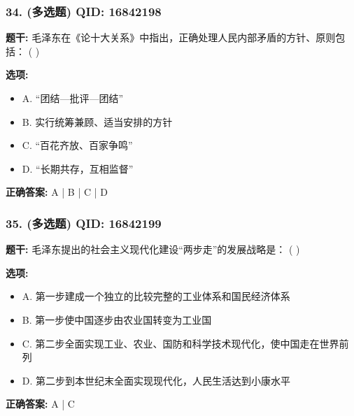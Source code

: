 \documentclass[12pt,UTF8]{ctexart}
\begin{document}
\subsubsection*{34. (多选题) \small QID: 16842198}

\textbf{题干:}
毛泽东在《论十大关系》中指出，正确处理人民内部矛盾的方针、原则包括： ( )

\textbf{选项:}
\begin{itemize}[leftmargin=*]

  \item A. “团结—批评—团结”

  \item B. 实行统筹兼顾、适当安排的方针

  \item C. “百花齐放、百家争鸣”

  \item D. “长期共存，互相监督”

\end{itemize}

\textbf{正确答案:}
A | B | C | D

\vspace{0.3em}\hrulefill\vspace{0.7em}

\subsubsection*{35. (多选题) \small QID: 16842199}

\textbf{题干:}
毛泽东提出的社会主义现代化建设“两步走”的发展战略是： ( )

\textbf{选项:}
\begin{itemize}[leftmargin=*]

  \item A. 第一步建成一个独立的比较完整的工业体系和国民经济体系

  \item B. 第一步使中国逐步由农业国转变为工业国

  \item C. 第二步全面实现工业、农业、国防和科学技术现代化，使中国走在世界前列

  \item D. 第二步到本世纪末全面实现现代化，人民生活达到小康水平

\end{itemize}

\textbf{正确答案:}
A | C

\vspace{0.3em}\hrulefill\vspace{0.7em}
\end{document}
